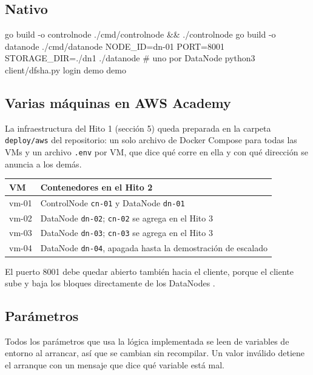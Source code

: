 \documentclass[10pt]{article}
\begin{document}
\subsection{Nativo}

\begin{codigo}
go build -o controlnode ./cmd/controlnode && ./controlnode
go build -o datanode ./cmd/datanode
NODE_ID=dn-01 PORT=8001 STORAGE_DIR=./dn1 ./datanode    # uno por DataNode
python3 client/dfsha.py login demo demo
\end{codigo}

\subsection{Varias máquinas en AWS Academy}

La infraestructura del Hito 1 (sección 5) queda preparada en la carpeta \texttt{deploy/aws} del repositorio: un solo archivo de Docker Compose para todas las VMs y un archivo \texttt{.env} por VM, que dice qué corre en ella y con qué dirección se anuncia a los demás.

\begin{xltabular}{\linewidth}{@{}L{2cm}Y@{}}
\toprule
VM & Contenedores en el Hito 2 \\
\midrule\endhead
vm-01 & ControlNode \texttt{cn-01} y DataNode \texttt{dn-01} \\
vm-02 & DataNode \texttt{dn-02}; \texttt{cn-02} se agrega en el Hito 3 \\
vm-03 & DataNode \texttt{dn-03}; \texttt{cn-03} se agrega en el Hito 3 \\
vm-04 & DataNode \texttt{dn-04}, apagada hasta la demostración de escalado \\
\bottomrule
\end{xltabular}

El puerto 8001 debe quedar abierto también hacia el cliente, porque el cliente sube y baja los bloques directamente de los DataNodes .

\subsection{Parámetros}

Todos los parámetros que usa la lógica implementada se leen de variables de entorno al arrancar, así que se cambian sin recompilar. Un valor inválido detiene el arranque con un mensaje que dice qué variable está mal.
\end{document}

